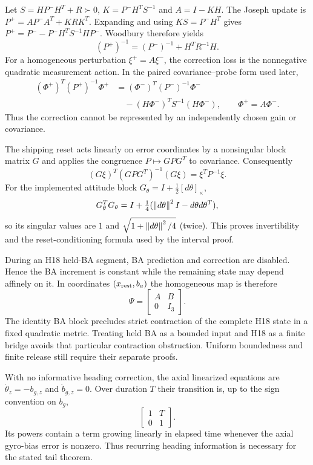 \documentclass[journal]{IEEEtran}
\begin{document}
\begin{proposition}
Let $S=HP^-H^T+R\succ0$, $K=P^-H^TS^{-1}$ and $A=I-KH$.
The Joseph update is $P^+=AP^-A^T+KRK^T$.  Expanding and using
$KS=P^-H^T$ gives $P^+=P^--P^-H^TS^{-1}HP^-$.  Woodbury therefore yields
\[
 (P^+)^{-1}=(P^-)^{-1}+H^TR^{-1}H .
\]
For a homogeneous perturbation $\xi^+=A\xi^-$, the correction loss is the
nonnegative quadratic measurement action.  In the paired covariance--probe
form used later,
\[
 \begin{aligned}
 (\Phi^+)^T(P^+)^{-1}\Phi^+
 &= (\Phi^-)^T(P^-)^{-1}\Phi^-\\
 &\quad -(H\Phi^-)^TS^{-1}(H\Phi^-),
 \qquad\Phi^+=A\Phi^- .
\end{aligned}
\]
Thus the correction cannot be represented by an independently chosen gain or
covariance.
\end{proposition}

\begin{proposition}
The shipping reset acts linearly on error coordinates by a nonsingular block
matrix $G$ and applies the congruence $P\mapsto GPG^T$ to covariance.
Consequently
\[
 (G\xi)^T(GPG^T)^{-1}(G\xi)=\xi^TP^{-1}\xi .
\]
For the implemented attitude block $G_\theta=I+\frac12[d\theta]_\times$,
\[
G_\theta^TG_\theta
=I+\tfrac14(\left\lVert d\theta\right\rVert^2I-d\theta d\theta^T),
\]
so its singular values are $1$ and
$\sqrt{1+\left\lVert d\theta\right\rVert^2/4}$ (twice).  This proves invertibility and the
reset-conditioning formula used by the interval proof.
\end{proposition}

\begin{proposition}
During an H18 held-BA segment, BA prediction and correction are disabled.
Hence the BA increment is constant while the remaining state may depend
affinely on it.  In coordinates $(x_{\rm rest},b_a)$ the homogeneous map is
therefore
\[
 \Psi=\begin{bmatrix}A&B\\0&I_3\end{bmatrix}.
\]
The identity BA block precludes strict contraction of the complete H18 state
in a fixed quadratic metric.  Treating held BA as a bounded input and H18 as
a finite bridge avoids that particular contraction obstruction. Uniform
boundedness and finite release still require their separate proofs.
\end{proposition}

\begin{proposition}
With no informative heading correction, the axial linearized equations are
$\dot\theta_z=-b_{g,z}$ and $\dot b_{g,z}=0$.  Over duration $T$ their
transition is, up to the sign convention on $b_g$,
\[
 \begin{bmatrix}1&T\\0&1\end{bmatrix}.
\]
Its powers contain a term growing linearly in elapsed time whenever the axial
gyro-bias error is nonzero.  Thus recurring heading information is necessary
for the stated tail theorem.
\end{proposition}
\end{document}
